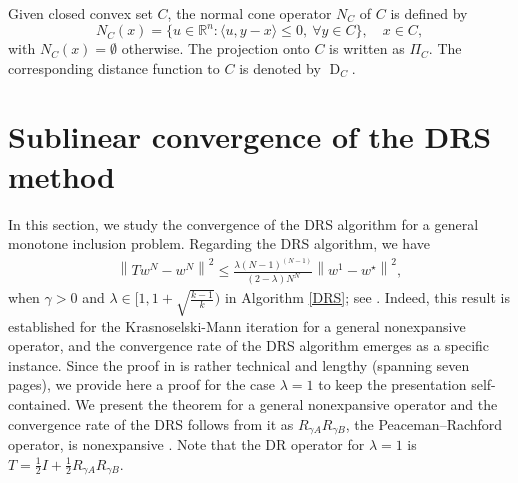 \documentclass[ijoc,sglanonrev]{informs4}
\DeclareMathOperator{\dist}{D}
\begin{document}
Given closed convex set $C$, the normal cone operator $N_C$ of $C$ is defined by 
\[
N_C(x) = \{u \in \mathbb{R}^n : \langle u, y-x \rangle \leq 0, \ \forall y \in C\}, \quad x \in C,
\]
with $N_C(x) = \emptyset$ otherwise. 
The projection onto  $C$ is written as $\Pi_C$. The corresponding distance function to $C$ is denoted by $\dist_C$.



\section{Sublinear convergence of the DRS method} \label{Sub_s}

In this section, we study the convergence of the DRS algorithm for a general monotone inclusion problem. Regarding the DRS algorithm, we have 
 \begin{align}\label{OO}
\left\|Tw^N - w^N\right\|^2 \leq  \tfrac{\lambda(N-1)^{(N-1)}}{(2-\lambda)N^N} \left\|w^1 - w^\star\right\|^2,
\end{align}
when $\gamma >0$ and $\lambda\in [1, 1+\sqrt{\tfrac{k-1}{k}})$ in Algorithm \ref{DRS}; see \cite[Theorem 4.9]{lieder2018projection}. Indeed, this result is established for the Krasnoselski-Mann iteration for a general nonexpansive operator, and the convergence rate of the DRS algorithm emerges as a specific instance. Since the proof in \cite{lieder2018projection} is rather technical and lengthy (spanning seven pages), we provide here a proof for the case $\lambda=1$  to keep the presentation self-contained. We present the theorem for a general nonexpansive operator and the convergence rate of the DRS follows from it as $R_{\gamma A}R_{\gamma B}$, the Peaceman–Rachford operator, is nonexpansive \cite{ryu2022large}. Note that the DR operator for $\lambda=1$ is 
$T=\tfrac{1}{2}I+\tfrac{1}{2}R_{\gamma A}R_{\gamma B}$.
\end{document}
